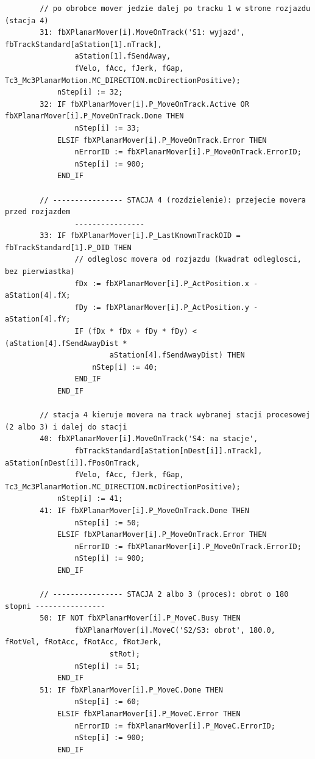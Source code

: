 \documentclass[11pt,a4paper]{report}
\begin{document}
{\begin{verbatim}
        // po obrobce mover jedzie dalej po tracku 1 w strone rozjazdu (stacja 4)
        31: fbXPlanarMover[i].MoveOnTrack('S1: wyjazd', fbTrackStandard[aStation[1].nTrack],
                aStation[1].fSendAway,
                fVelo, fAcc, fJerk, fGap, Tc3_Mc3PlanarMotion.MC_DIRECTION.mcDirectionPositive);
            nStep[i] := 32;
        32: IF fbXPlanarMover[i].P_MoveOnTrack.Active OR fbXPlanarMover[i].P_MoveOnTrack.Done THEN
                nStep[i] := 33;
            ELSIF fbXPlanarMover[i].P_MoveOnTrack.Error THEN
                nErrorID := fbXPlanarMover[i].P_MoveOnTrack.ErrorID;
                nStep[i] := 900;
            END_IF

        // ---------------- STACJA 4 (rozdzielenie): przejecie movera przed rozjazdem
                ----------------
        33: IF fbXPlanarMover[i].P_LastKnownTrackOID = fbTrackStandard[1].P_OID THEN
                // odleglosc movera od rozjazdu (kwadrat odleglosci, bez pierwiastka)
                fDx := fbXPlanarMover[i].P_ActPosition.x - aStation[4].fX;
                fDy := fbXPlanarMover[i].P_ActPosition.y - aStation[4].fY;
                IF (fDx * fDx + fDy * fDy) < (aStation[4].fSendAwayDist *
                        aStation[4].fSendAwayDist) THEN
                    nStep[i] := 40;
                END_IF
            END_IF

        // stacja 4 kieruje movera na track wybranej stacji procesowej (2 albo 3) i dalej do stacji
        40: fbXPlanarMover[i].MoveOnTrack('S4: na stacje',
                fbTrackStandard[aStation[nDest[i]].nTrack], aStation[nDest[i]].fPosOnTrack,
                fVelo, fAcc, fJerk, fGap, Tc3_Mc3PlanarMotion.MC_DIRECTION.mcDirectionPositive);
            nStep[i] := 41;
        41: IF fbXPlanarMover[i].P_MoveOnTrack.Done THEN
                nStep[i] := 50;
            ELSIF fbXPlanarMover[i].P_MoveOnTrack.Error THEN
                nErrorID := fbXPlanarMover[i].P_MoveOnTrack.ErrorID;
                nStep[i] := 900;
            END_IF

        // ---------------- STACJA 2 albo 3 (proces): obrot o 180 stopni ----------------
        50: IF NOT fbXPlanarMover[i].P_MoveC.Busy THEN
                fbXPlanarMover[i].MoveC('S2/S3: obrot', 180.0, fRotVel, fRotAcc, fRotAcc, fRotJerk,
                        stRot);
                nStep[i] := 51;
            END_IF
        51: IF fbXPlanarMover[i].P_MoveC.Done THEN
                nStep[i] := 60;
            ELSIF fbXPlanarMover[i].P_MoveC.Error THEN
                nErrorID := fbXPlanarMover[i].P_MoveC.ErrorID;
                nStep[i] := 900;
            END_IF


\end{verbatim}}
\end{document}
